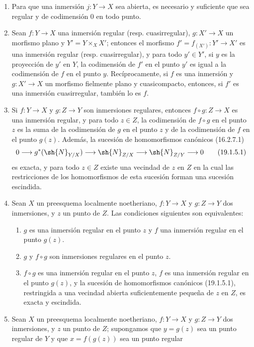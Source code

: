 \begin{proposition}[19.1.5]
\label{IV.19.1.5}
\begin{enumerate}
  \item[\textup{(i)}] Para que una inmersión $j:Y\to X$ sea abierta, es necesario y suficiente que sea regular y de codimensión $0$ en todo punto.
  \item[\textup{(ii)}] Sean $f:Y\to X$ una inmersión regular \textup{(resp.} cuasirregular\textup{)}, $g:X'\to X$ un morfismo plano y $Y'=Y\times_X X'$; entonces el morfismo $f'=f_{(X')}:Y'\to X'$ es una inmersión regular \textup{(resp.} cuasirregular\textup{)}, y para todo $y'\in Y'$, si $y$ es la proyección de $y'$ en $Y$, la codimensión de $f'$ en el punto $y'$ es igual a la codimensión de $f$ en el punto $y$. Recíprocamente, si $f$ es una inmersión y $g:X'\to X$ un morfismo fielmente plano y cuasicompacto, entonces, si $f'$ es una inmersión cuasirregular, también lo es $f$.
  \item[\textup{(iii)}] Si $f:Y\to X$ y $g:Z\to Y$ son inmersiones regulares, entonces $f\circ g:Z\to X$ es una inmersión regular, y para todo $z\in Z$, la codimensión de $f\circ g$ en el punto $z$ es la suma de la codimensión de $g$ en el punto $z$ y de la codimensión de $f$ en el punto $g(z)$. Además, la sucesión de homomorfismos canónicos \textup{(16.2.7.1)}
\begin{equation}
  0\longrightarrow g^*(\sh{N}_{Y/X})\longrightarrow\sh{N}_{Z/X}\longrightarrow\sh{N}_{Z/Y}\longrightarrow0
  \tag{19.1.5.1}\label{IV.19.1.5.1}
\end{equation}
es exacta, y para todo $z\in Z$ existe una vecindad de $z$ en $Z$ en la cual las restricciones de los homomorfismos de esta sucesión forman una sucesión escindida.
  \item[\textup{(iv)}] Sean $X$ un preesquema localmente noetheriano, $f:Y\to X$ y $g:Z\to Y$ dos inmersiones, y $z$ un punto de $Z$. Las condiciones siguientes son equivalentes:
  \begin{enumerate}
    \item[\textup{a)}] $g$ es una inmersión regular en el punto $z$ y $f$ una inmersión regular en el punto $g(z)$.
    \item[\textup{b)}] $g$ y $f\circ g$ son inmersiones regulares en el punto $z$.
    \item[\textup{c)}] $f\circ g$ es una inmersión regular en el punto $z$, $f$ es una inmersión regular en el punto $g(z)$, y la sucesión de homomorfismos canónicos \textup{(19.1.5.1)}, restringida a una vecindad abierta suficientemente pequeña de $z$ en $Z$, es exacta y escindida.
  \end{enumerate}
  \item[\textup{(v)}] Sean $X$ un preesquema localmente noetheriano, $f:Y\to X$ y $g:Z\to Y$ dos inmersiones, y $z$ un punto de $Z$; supongamos que $y=g(z)$ sea un punto regular de $Y$ y que $x=f(g(z))$ sea un punto regular


\end{enumerate}
\end{proposition}
